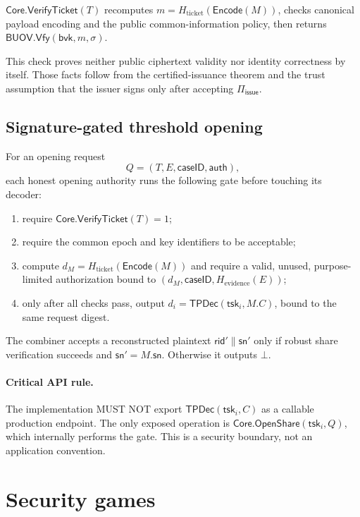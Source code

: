\documentclass[11pt]{article}
\newcommand{\Core}{\mathsf{Core}}
\newcommand{\BUOV}{\mathsf{BUOV}}
\newcommand{\Piiss}{\Pi_{\mathsf{issue}}}
\newcommand{\TPDec}{\mathsf{TPDec}}
\newcommand{\rid}{\mathsf{rid}}
\newcommand{\sn}{\mathsf{sn}}
\begin{document}
$\Core.\mathsf{VerifyTicket}(T)$ recomputes
$m=H_{\mathrm{ticket}}(\mathsf{Encode}(M))$, checks canonical payload
encoding and the public common-information policy, then returns
$\BUOV.\mathsf{Vfy}(\mathsf{bvk},m,\sigma)$.

This check proves neither public ciphertext validity nor identity correctness by
itself.  Those facts follow from the certified-issuance theorem and the trust
assumption that the issuer signs only after accepting $\Piiss$.

\subsection{Signature-gated threshold opening}

For an opening request
\[
  Q=(T,E,\mathsf{caseID},\mathsf{auth}),
\]
each honest opening authority runs the following gate before touching its
decoder:

\begin{enumerate}[leftmargin=*]
  \item require $\Core.\mathsf{VerifyTicket}(T)=1$;
  \item require the common epoch and key identifiers to be acceptable;
  \item compute $d_M=H_{\mathrm{ticket}}(\mathsf{Encode}(M))$ and require a
  valid, unused, purpose-limited authorization bound to
  $(d_M,\mathsf{caseID},H_{\mathrm{evidence}}(E))$;
  \item only after all checks pass, output
  $d_i=\TPDec(\mathsf{tsk}_i,M.C)$, bound to the same request digest.
\end{enumerate}

The combiner accepts a reconstructed plaintext $\rid'\|\sn'$ only if robust
share verification succeeds and $\sn'=M.\sn$.  Otherwise it outputs $\bot$.

\paragraph{Critical API rule.}
The implementation MUST NOT export
$\TPDec(\mathsf{tsk}_i,C)$ as a callable production endpoint.  The only exposed
operation is $\Core.\mathsf{OpenShare}(\mathsf{tsk}_i,Q)$, which internally
performs the gate.  This is a security boundary, not an application convention.

\section{Security games}
\end{document}
